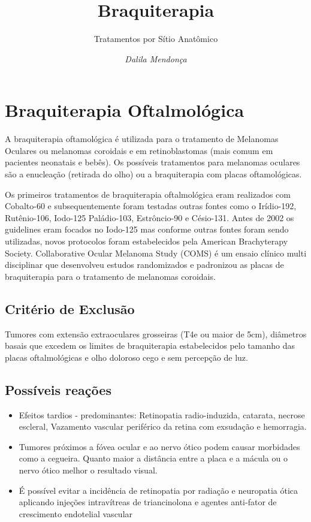 \documentclass[11pt,a4paper]{article}
\title{Braquiterapia}
\author{Tratamentos por Sítio Anatômico\nocite{*}}
\date{\textit{Dalila Mendonça}}
\begin{document}
	\maketitle

    \section{Braquiterapia Oftalmológica}


    A braquiterapia oftamológica é utilizada para o tratamento de Melanomas Oculares ou melanomas coroidais e em retinoblastomas (mais comum em pacientes neonatais e bebês). Os possíveis tratamentos para melanomas oculares são a enucleação (retirada do olho) ou a braquiterapia com placas oftamológicas. 
    
    Os primeiros tratamentos de braquiterapia oftalmológica eram realizados com Cobalto-60 e subsequentemente foram testadas outras fontes como o Irídio-192, Rutênio-106, Iodo-125  Paládio-103, Estrôncio-90 e Césio-131. Antes de 2002 os guidelines eram focados no Iodo-125 mas conforme outras fontes foram sendo utilizadas, novos protocolos foram estabelecidos pela American Brachyterapy Society. Collaborative Ocular Melanoma Study (COMS) é um ensaio clínico multi disciplinar que desenvolveu estudos randomizados e padronizou as placas de braquiterapia para o tratamento de melanomas coroidais.


    \subsection{Critério de Exclusão}

    Tumores com extensão extraoculares grosseiras (T4e ou maior de 5cm), diâmetros basais que excedem os limites de braquiterapia estabelecidos pelo tamanho das placas oftalmológicas e olho doloroso cego e sem percepção de luz.

\subsection{Possíveis reações}


    \begin{itemize}
        \item Efeitos tardios - predominantes: Retinopatia radio-induzida, catarata, necrose escleral, Vazamento vascular periférico da retina com exsudação e hemorragia.
        \item Tumores próximos a fóvea ocular e ao nervo ótico podem causar morbidades como a cegueira. Quanto maior a distância entre a placa e a mácula ou o nervo ótico melhor o resultado visual.
        \item É possível evitar a incidência de retinopatia por radiação e neuropatia ótica aplicando injeções intravítreas de triancinolona e agentes anti-fator de crescimento endotelial vascular
    \end{itemize}
\end{document}
